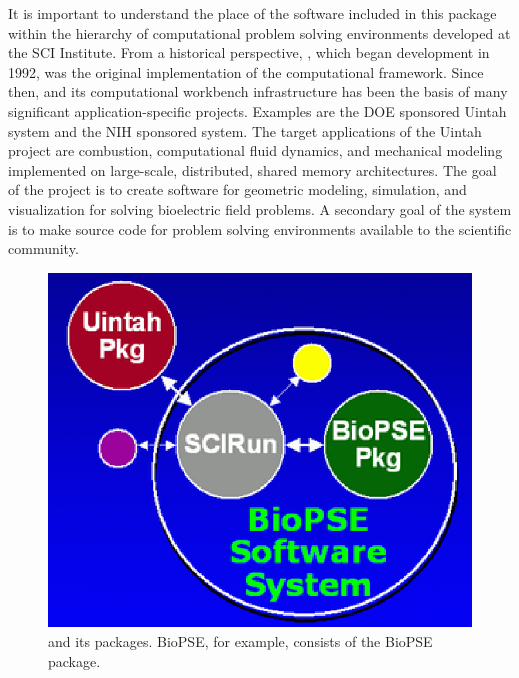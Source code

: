 \newcommand{\eabfig}{%
  \includegraphics{../FAQ/EAB-BioPSE.eps}
}
\begin{htmlonly}
  \newcommand{\eabfig}{%
    \htmladdimg[align=left,alt=""]{../../FAQ/EAB-BioPSE.gif}
  }
\end{htmlonly}

It is important to understand the place of the software included in
this package within the hierarchy of computational problem solving
environments developed at the SCI Institute.  From a historical
perspective, \SR{}, which began development in 1992, was the
original implementation of the computational
framework\cite{CRJ:Joh94c,RSM:Par95,RSM:Par95b,RSM:Par97,RSM:Par97b,CRJ:Parker99b}.
Since then, \SR{} and its computational workbench infrastructure has
been the basis of many significant application-specific projects. 
Examples are the DOE sponsored Uintah system \cite{RSM:Dav2000}
and the NIH sponsored \BIOPSE{} system.  The target applications of
the Uintah project are combustion, computational fluid dynamics, and
mechanical modeling implemented on large-scale, distributed, shared
memory architectures.  The goal of the \BIOPSE{} project is to create
software for geometric modeling, simulation, and visualization for
solving bioelectric field problems.  A secondary goal of
the \SR{} system is to make source code for  problem solving
environments available to the scientific community.

\begin{figure}[htb]
  \centering
  \begin{makeimage} \end{makeimage}
  \eabfig
  \caption{\label{fig:eab-BioPSE} \sr{} and its
    packages.  BioPSE, for example, consists of \sr{}
    the BioPSE package.}
\end{figure}

